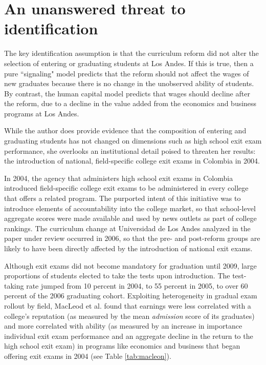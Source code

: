 \documentclass[a4paper, 11pt]{article}
\begin{document}
\section*{An unanswered threat to identification}

The key identification assumption is that the curriculum reform did not alter the selection of entering or graduating students at Los Andes.  If this is true, then a pure ``signaling" model predicts that the reform should not affect the wages of new graduates because there is no change in the unobserved ability of students.  By contrast, the human capital model predicts that wages should decline after the reform, due to a decline in the value added from the economics and business programs at Los Andes. 

While the author does provide evidence that the composition of entering and graduating students has not changed on dimensions such as high school exit exam performance, she overlooks an institutional detail poised to threaten her results: the introduction of national, field-specific college exit exams in Colombia in 2004.

In 2004, the agency that administers high school exit exams in Colombia introduced field-specific college exit exams to be administered in every college that offers a related program.  The purported intent of this initiative was to introduce elements of accountability into the college market, so that school-level aggregate scores were made available and used by news outlets as part of college rankings.   The curriculum change at Universidad de Los Andes analyzed in the paper under review occurred in 2006, so that the pre- and post-reform groups are likely to have been directly affected by the introduction of national exit exams. 

Although exit exams did not become mandatory for graduation until 2009, large proportions of students elected to take the tests upon introduction.  The test-taking rate jumped from 10 percent in 2004, to 55 percent in 2005, to over 60 percent of the 2006 graduating cohort.  Exploiting heterogeneity in gradual exam rollout by field, MacLeod et al. found that earnings were less correlated with a college's reputation (as measured by the mean \textit{admission} score of its graduates) and more correlated with ability (as measured by an increase in importance individual exit exam performance and an aggregate decline in the return to the high school exit exam) in programs like economics and business that began offering exit exams in 2004 (see Table \ref{tab:macleon}).  
\end{document}
